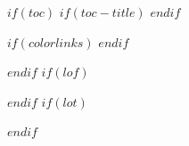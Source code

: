$if(toc)$
$if(toc-title)$
\renewcommand*\contentsname{$toc-title$}
$endif$
{
$if(colorlinks)$
\hypersetup{linkcolor=$if(toccolor)$$toccolor$$else$$endif$}
$endif$
\setcounter{tocdepth}{$toc-depth$}
\begin{singlespace}
\tableofcontents
\end{singlespace}
}
$endif$
$if(lof)$
\begin{singlespace}
\listoffigures
\end{singlespace}
$endif$
$if(lot)$
\begin{singlespace}
\listoftables
\end{singlespace}
$endif$